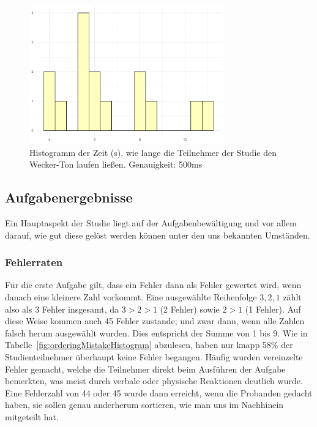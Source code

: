 \begin{figure}[H]
	\centering
	\includegraphics[width=0.75\textwidth]{./_StudyResults/alarmDurationHist}
	\caption{Histogramm der Zeit (s), wie lange die Teilnehmer der Studie den Wecker-Ton laufen ließen. Genauigkeit: 500ms}
	\label{fig:countingTimeHistogram}
\end{figure}

\subsection{Aufgabenergebnisse} %

Ein Hauptaspekt der Studie liegt auf der Aufgabenbewältigung und vor allem darauf, wie gut diese gelöst werden können unter den uns bekannten Umständen. 

\subsubsection{Fehlerraten}

Für die erste Aufgabe gilt, dass ein Fehler dann als Fehler gewertet wird, wenn danach eine kleinere Zahl vorkommt. Eine ausgewählte Reihenfolge $3, 2, 1$ zählt also als 3 Fehler insgesamt, da $3 > 2 > 1$ (2 Fehler) sowie $2 > 1$ (1 Fehler). Auf diese Weise kommen auch 45 Fehler zustande; und zwar dann, wenn alle Zahlen falsch herum ausgewählt wurden. Dies entspricht der Summe von 1 bis 9.
Wie in Tabelle~\ref{fig:orderingMistakeHistogram} abzulesen, haben nur knapp 58\% der Studienteilnehmer überhaupt keine Fehler begangen. Häufig wurden vereinzelte Fehler gemacht, welche die Teilnehmer direkt beim Ausführen der Aufgabe bemerkten, was meist durch verbale oder physische Reaktionen deutlich wurde. 
Eine Fehlerzahl von 44 oder 45 wurde dann erreicht, wenn die Probanden gedacht haben, sie sollen genau anderherum sortieren, wie man uns im Nachhinein mitgeteilt hat.

